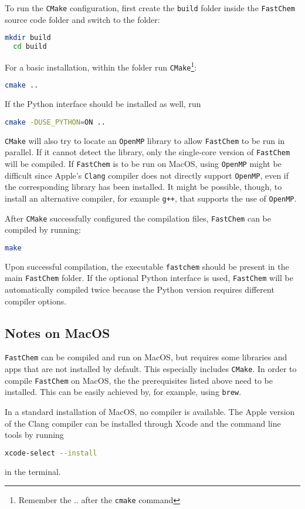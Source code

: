 \documentclass[numbers=noenddot]{aux/fcmanual}
\newcommand{\fc}{\texttt{FastChem}\xspace}
\newcommand{\ttt}[1]{\texttt {#1}}
\begin{document}
To run the \ttt{CMake} configuration, first create the \texttt{build} folder inside the \fc source code folder and switch to the folder:
\begin{lstlisting}[language=bash]
  mkdir build
  cd build
\end{lstlisting}
For a basic installation, within the folder run \texttt{CMake}\footnote{Remember the .. after the \texttt{cmake} command}:
\begin{lstlisting}[language=bash]
  cmake ..
\end{lstlisting}

If the Python interface should be installed as well, run
\begin{lstlisting}[language=bash]
  cmake -DUSE_PYTHON=ON ..
\end{lstlisting}

\texttt{CMake} will also try to locate an \texttt{OpenMP} library to allow \fc to be run in parallel. If it cannot detect the library, only the single-core version of \fc will be compiled. If \fc is to be run on MacOS, using \texttt{OpenMP} might be difficult since Apple's \texttt{Clang} compiler does not directly support \texttt{OpenMP}, even if the corresponding library has been installed. It might be possible, though, to install an alternative compiler, for example \texttt{g++}, that supports the use of \texttt{OpenMP}. 

After \texttt{CMake} successfully configured the compilation files, \fc can be compiled by running:
\begin{lstlisting}[language=bash]
  make
\end{lstlisting}
Upon successful compilation, the executable \texttt{fastchem} should be present in the main \fc folder. If the optional Python interface is used, \fc will be automatically compiled twice because the Python version requires different compiler options.


\subsection{Notes on MacOS}

\fc can be compiled and run on MacOS, but requires some libraries and apps that are not installed by default. This especially includes \texttt{CMake}. In order to compile \fc on MacOS, the the prerequisites listed above need to be installed. This can be easily achieved by, for example, using \texttt{brew}. 

In a standard installation of MacOS, no compiler is available. The Apple version of the Clang compiler can be installed through Xcode and the command line tools by running
\begin{lstlisting}[language=bash]
  xcode-select --install
\end{lstlisting}
in the terminal.
\end{document}
